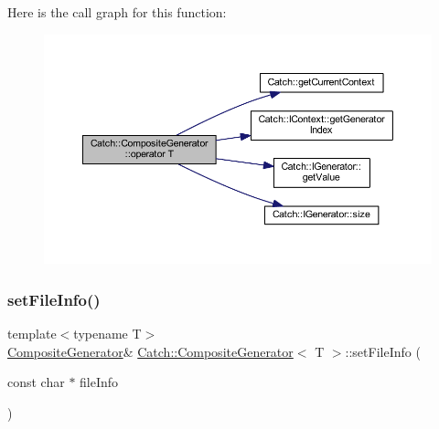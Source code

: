 Here is the call graph for this function\+:\nopagebreak
\begin{figure}[H]
\begin{center}
\leavevmode
\includegraphics[width=350pt]{class_catch_1_1_composite_generator_a83d6c941e2e735b9528e6e832f7b76e7_cgraph}
\end{center}
\end{figure}
\hypertarget{class_catch_1_1_composite_generator_ac3c57cf4ca5472f440bf71e2936bcd4a}{}\label{class_catch_1_1_composite_generator_ac3c57cf4ca5472f440bf71e2936bcd4a} 
\subsubsection{\texorpdfstring{set\+File\+Info()}{setFileInfo()}}
{\footnotesize\ttfamily template$<$typename T$>$ \\
\hyperlink{class_catch_1_1_composite_generator}{Composite\+Generator}\& \hyperlink{class_catch_1_1_composite_generator}{Catch\+::\+Composite\+Generator}$<$ T $>$\+::set\+File\+Info (\begin{DoxyParamCaption}\item[{const char $\ast$}]{file\+Info }\end{DoxyParamCaption})\hspace{0.3cm}{\ttfamily [inline]}}

\hypertarget{class_catch_1_1_composite_generator_a2e03f42df85cdd238aabd77a80b075d5}{}\label{class_catch_1_1_composite_generator_a2e03f42df85cdd238aabd77a80b075d5} 
